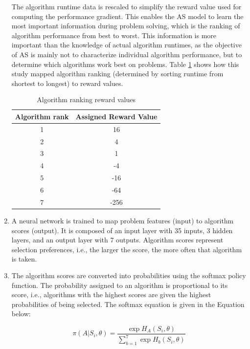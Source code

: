 \begin{enumerate}
	The algorithm runtime data is rescaled to simplify the reward value used for computing the performance gradient. This enables the AS model to learn the most important information during problem solving, which is the ranking of algorithm performance from best to worst. This information is more important than the knowledge of actual algorithm runtimes, as the objective of AS is mainly not to characterize individual algorithm performance, but to determine which algorithms work best on problems. Table \ref{tbl:rewardscaling} shows how this study mapped algorithm ranking (determined by sorting runtime from shortest to longest) to reward values.

	\begin{table}[H]
		\centering
		\begin{tabular}{|c|c|}
			\hline
			\multicolumn{1}{|l|}{\textbf{Algorithm rank}} & \multicolumn{1}{l|}{\textbf{Assigned Reward Value}} \\ \hline
			1 & 16 \\ \hline
			2 & 4 \\ \hline
			3 & 1 \\ \hline
			4 & -4 \\ \hline
			5 & -16 \\ \hline
			6 & -64 \\ \hline
			7 & -256 \\ \hline
		\end{tabular}
		\caption{Algorithm ranking reward values}
		\label{tbl:rewardscaling}
	\end{table}
	
	\item A neural network is trained to map problem features (input) to algorithm scores (output). It is composed of an input layer with 35 inputs, 3 hidden layers, and an output layer with 7 outputs. Algorithm scores represent selection preferences, i.e., the larger the score, the more often that algorithm is taken.
	
	\item The algorithm scores are converted into probabilities using the softmax policy function. The probability assigned to an algorithm is proportional to its score, i.e., algorithms with the highest scores are given the highest probabilities of being selected. The softmax equation is given in the Equation below:
	
	\begin{equation}
	\pi(A | S_i, \theta) = \frac{\exp{H_A(S_i, \theta)}}{\sum_{b=1}^{7}\exp{H_b(S_i, \theta)}}
	\end{equation}
	

\end{enumerate}
